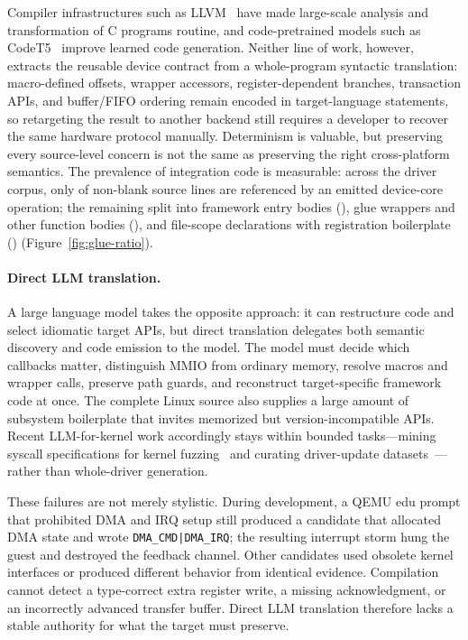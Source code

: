 Compiler infrastructures such as LLVM~\cite{lattner2004llvm} have made
large-scale analysis and transformation of C programs routine, and
code-pretrained models such as CodeT5~\cite{wang2021codet5} improve learned
code generation. Neither line of work, however, extracts the reusable device
contract from a whole-program syntactic translation: macro-defined offsets,
wrapper accessors, register-dependent branches, transaction APIs, and
buffer/FIFO ordering remain encoded in target-language statements, so
retargeting the result to another backend still requires a developer to
recover the same hardware protocol manually. Determinism is valuable, but
preserving every source-level concern is not the same as preserving the
right cross-platform semantics. The prevalence of integration code is
measurable: across the \EvalDrivers{} driver corpus, only \GlueCorePct{} of
non-blank source lines are referenced by an emitted device-core operation;
the remaining \GlueGluePct{} split into framework entry bodies
(\GlueEntryPct{}), glue wrappers and other function bodies
(\GlueHelperPct{}), and file-scope declarations with registration
boilerplate (\GlueFileScopePct{}) (Figure~\ref{fig:glue-ratio}).

\paragraph{Direct LLM translation.} A large language model takes the
opposite approach: it can restructure code and select idiomatic target
APIs, but direct translation delegates both semantic discovery and code
emission to the model. The model must decide which
callbacks matter, distinguish MMIO from ordinary memory, resolve macros and
wrapper calls, preserve path guards, and reconstruct target-specific framework
code at once. The complete Linux source also supplies a large amount of
subsystem boilerplate that invites memorized but version-incompatible APIs. Recent
LLM-for-kernel work accordingly stays within bounded tasks---mining syscall
specifications for kernel fuzzing~\cite{yang2025kernelgpt} and curating
driver-update datasets~\cite{kharlamova2025kernel}---rather than whole-driver
generation.

These failures are not merely stylistic. During development, a QEMU edu prompt that prohibited DMA and IRQ setup still produced a candidate that allocated DMA state and wrote \texttt{DMA\_CMD|DMA\_IRQ}; the resulting interrupt storm hung the guest and destroyed the feedback channel. Other candidates used obsolete kernel interfaces or produced different behavior from identical evidence. Compilation cannot detect a type-correct extra register write, a missing acknowledgment, or an incorrectly advanced transfer buffer. Direct LLM translation therefore lacks a stable authority for what the target must preserve.

